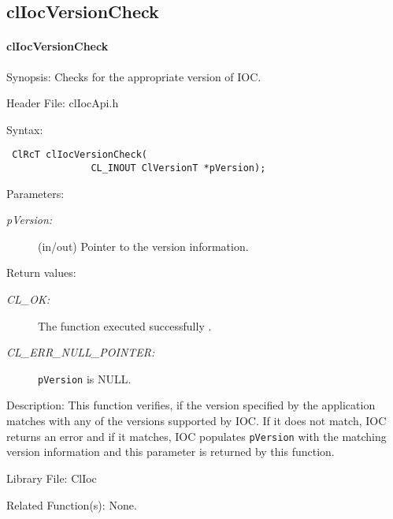 \begin{flushleft}
\subsection{clIocVersionCheck}
\hypertarget{pageioc140}{}\paragraph{cl\-Ioc\-Version\-Check}\label{pageioc140}
\begin{Desc}
\item[Synopsis:]Checks for the appropriate version of IOC.\end{Desc}
\begin{Desc}
\item[Header File:]clIocApi.h\end{Desc}
\begin{Desc}
\item[Syntax:]

\footnotesize\begin{verbatim} ClRcT clIocVersionCheck(
               CL_INOUT ClVersionT *pVersion);
\end{verbatim}
\normalsize
\end{Desc}
\begin{Desc}
\item[Parameters:]
\begin{description}
\item[{\em p\-Version:}](in/out) Pointer to the version information.\end{description}
\end{Desc}
\begin{Desc}
\item[Return values:]
\begin{description}
\item[{\em CL\_\-OK:}]The function executed successfully . \item[{\em CL\_\-ERR\_\-NULL\_\-POINTER:}]{\tt{pVersion}} is NULL.\end{description}
\end{Desc}
\begin{Desc}
\item[Description:]This function verifies, if the version specified by the application matches with any of the versions supported by IOC. If it does not
match, IOC returns an error and if it matches, IOC populates {\tt{p\-Version}} with the matching version information and this parameter is returned
by this function.\end{Desc}
\begin{Desc}
\item[Library File:]Cl\-Ioc\end{Desc}
\begin{Desc}
\item[Related Function(s):]None. \end{Desc}
\newpage






\end{flushleft}
